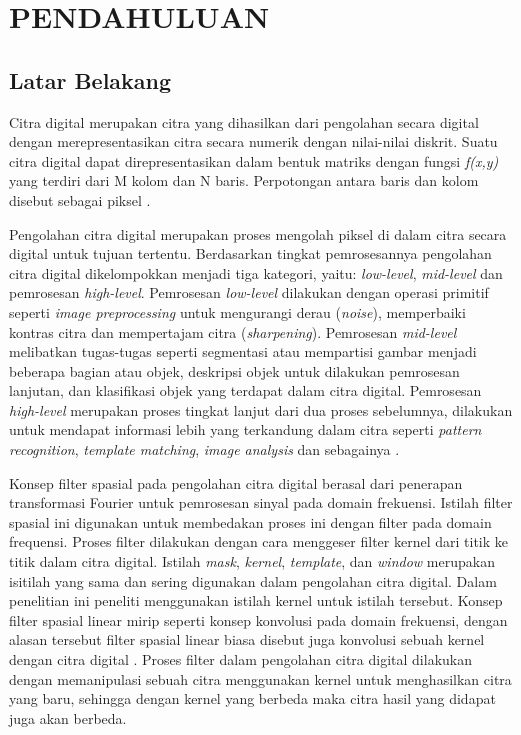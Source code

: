 \chapter{PENDAHULUAN}

\section{Latar Belakang}


Citra digital merupakan citra yang dihasilkan dari pengolahan secara digital dengan merepresentasikan citra secara numerik dengan nilai-nilai diskrit. Suatu citra digital dapat direpresentasikan dalam bentuk matriks dengan fungsi \textit{f(x,y)} yang terdiri dari M kolom dan N baris. Perpotongan antara baris dan kolom disebut sebagai piksel \cite{book:gonzalez}. 

Pengolahan citra digital merupakan proses mengolah piksel di dalam citra secara digital untuk tujuan tertentu. Berdasarkan tingkat pemrosesannya pengolahan citra digital dikelompokkan menjadi tiga kategori, yaitu: \textit{low-level}, \textit{mid-level} dan pemrosesan \textit{high-level}. Pemrosesan \textit{low-level} dilakukan dengan operasi primitif seperti \textit{image preprocessing} untuk mengurangi derau (\textit{noise}), memperbaiki kontras citra dan mempertajam citra (\textit{sharpening}). Pemrosesan \textit{mid-level} melibatkan tugas-tugas seperti segmentasi atau mempartisi gambar menjadi beberapa bagian atau objek, deskripsi objek untuk dilakukan pemrosesan lanjutan, dan klasifikasi objek yang terdapat dalam citra digital. Pemrosesan \textit{high-level} merupakan proses tingkat lanjut dari dua proses sebelumnya, dilakukan untuk mendapat informasi lebih yang terkandung dalam citra seperti \textit{pattern recognition}, \textit{template matching}, \textit{image analysis} dan sebagainya \cite{book:gonzalez}.


Konsep filter spasial pada pengolahan citra digital berasal dari penerapan transformasi Fourier untuk pemrosesan sinyal pada domain frekuensi. Istilah filter spasial ini digunakan untuk membedakan proses ini dengan filter pada domain frequensi. Proses filter dilakukan dengan cara menggeser filter kernel dari titik ke titik dalam citra digital. Istilah \textit{mask}, \textit{kernel}, \textit{template}, dan \textit{window} merupakan isitilah yang sama dan sering digunakan dalam pengolahan citra digital. Dalam penelitian ini peneliti menggunakan istilah kernel untuk istilah tersebut. Konsep filter spasial linear mirip seperti konsep konvolusi pada domain frekuensi, dengan alasan tersebut filter spasial linear biasa disebut juga konvolusi sebuah kernel dengan citra digital \cite{book:gonzalez}. Proses filter dalam pengolahan citra digital dilakukan dengan memanipulasi sebuah citra menggunakan kernel untuk menghasilkan citra yang baru, sehingga dengan kernel yang berbeda maka citra hasil yang didapat juga akan berbeda. 


